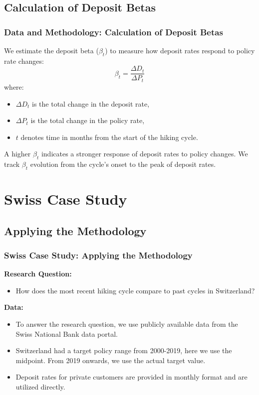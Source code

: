 \documentclass{beamer}
\begin{document}
\subsection{Calculation of Deposit Betas}
\begin{frame}
\frametitle{Data and Methodology: Calculation of Deposit Betas}
We estimate the deposit beta (\( \beta_t \)) to measure how deposit rates respond to policy rate changes:
\begin{equation}
\beta_t = \frac{\Delta D_t}{\Delta P_t}
\end{equation}
where:
\begin{itemize}
  \item \( \Delta D_t \) is the total change in the deposit rate,
  \item \( \Delta P_t \) is the total change in the policy rate,
  \item \( t \) denotes time in months from the start of the hiking cycle.
\end{itemize}
A higher \( \beta_t \) indicates a stronger response of deposit rates to policy changes. We track \( \beta_t \) evolution from the cycle's onset to the peak of deposit rates.
\end{frame}

\section{Swiss Case Study}
\subsection{Applying the Methodology}
\begin{frame}
\frametitle{Swiss Case Study: Applying the Methodology}
\textbf{Research Question:}
\begin{itemize}
  \item How does the most recent hiking cycle compare to past cycles in Switzerland?
\end{itemize}
\textbf{Data:}
\begin{itemize}
  \item To answer the research question, we use publicly available data from the Swiss National Bank data portal.
  \item Switzerland had a target policy range from 2000-2019, here we use the midpoint. From 2019 onwards, we use the actual target value.
  \item Deposit rates for private customers are provided in monthly format and are utilized directly.
\end{itemize}
\end{frame}
\end{document}
